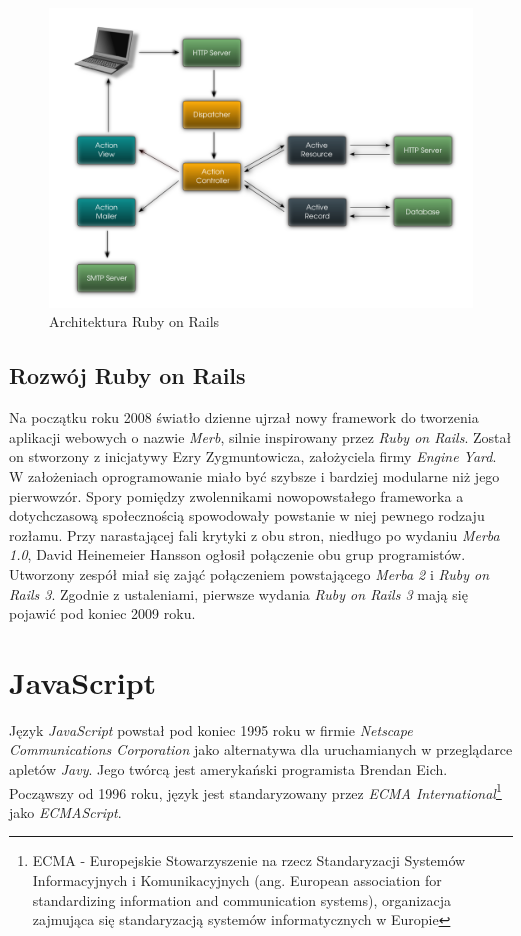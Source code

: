 \documentclass[11pt,twoside]{report}
\begin{document}
\begin{figure}[ht]
  \begin{center}
    \includegraphics[width=\linewidth]{railsarchitecture.png}
  \end{center}
  \caption{Architektura Ruby on Rails}
  \label{railsarchitecture}
\end{figure}

\subsection{Rozwój Ruby on Rails}
Na początku roku 2008 światło dzienne ujrzał nowy framework do
tworzenia aplikacji webowych o nazwie \emph{Merb}, silnie inspirowany
przez \emph{Ruby on Rails}. Został on stworzony z inicjatywy Ezry
Zygmuntowicza, założyciela firmy \emph{Engine Yard}. W założeniach
oprogramowanie miało być szybsze i bardziej modularne niż jego
pierwowzór. Spory pomiędzy zwolennikami nowopowstałego frameworka a
dotychczasową społecznością spowodowały powstanie w niej pewnego
rodzaju rozłamu. Przy narastającej fali krytyki z obu stron, niedługo
po wydaniu \emph{Merba 1.0}, David Heinemeier Hansson ogłosił
połączenie obu grup programistów\cite{merge}. Utworzony zespół miał
się zająć połączeniem powstającego \emph{Merba 2} i \emph{Ruby on
  Rails 3}. Zgodnie z ustaleniami, pierwsze wydania \emph{Ruby on
  Rails 3} mają się pojawić pod koniec 2009 roku.

\section{JavaScript}
Język \emph{JavaScript} powstał pod koniec 1995 roku w firmie
\emph{Netscape Communications Corporation} jako alternatywa dla
uruchamianych w przeglądarce apletów \emph{Javy}. Jego twórcą jest
amerykański programista Brendan Eich. Począwszy od 1996 roku, język
jest standaryzowany przez \emph{ECMA International}\footnote{ECMA -
  Europejskie Stowarzyszenie na rzecz Standaryzacji Systemów
  Informacyjnych i Komunikacyjnych (ang. European association for
  standardizing information and communication systems), organizacja
  zajmująca się standaryzacją systemów informatycznych w Europie} jako
\emph{ECMAScript}.
\label{javascript}
\end{document}
